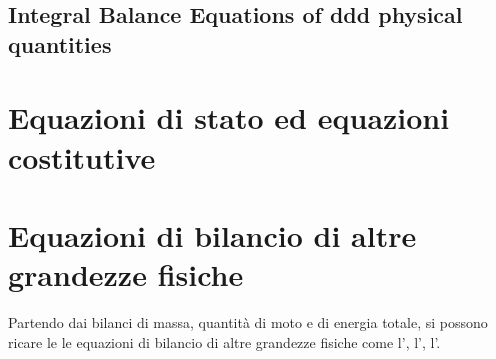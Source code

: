 \documentclass[letterpaper,10pt,english]{jupyterBook}
\begin{document}
\sphinxstepscope


\section{Integral Balance Equations of ddd physical quantities}
\label{\detokenize{ch/continuum/balance-derived-integral:integral-balance-equations-of-ddd-physical-quantities}}\label{\detokenize{ch/continuum/balance-derived-integral:continuum-governing-equations-primary-integral}}\label{\detokenize{ch/continuum/balance-derived-integral::doc}}


\sphinxstepscope


\chapter{Equazioni di stato ed equazioni costitutive}
\label{\detokenize{ch/continuum/constitutive-equations:equazioni-di-stato-ed-equazioni-costitutive}}\label{\detokenize{ch/continuum/constitutive-equations:continuum-constitutive-equations}}\label{\detokenize{ch/continuum/constitutive-equations::doc}}
\sphinxstepscope


\chapter{Equazioni di bilancio di altre grandezze fisiche}
\label{\detokenize{ch/continuum/derived-balances:equazioni-di-bilancio-di-altre-grandezze-fisiche}}\label{\detokenize{ch/continuum/derived-balances:continuum-derived-balances}}\label{\detokenize{ch/continuum/derived-balances::doc}}


\sphinxAtStartPar
Partendo dai bilanci di massa, quantità di moto e di energia totale, si possono ricare le le equazioni di bilancio di altre grandezze fisiche come l’, l’, l’.
\end{document}
